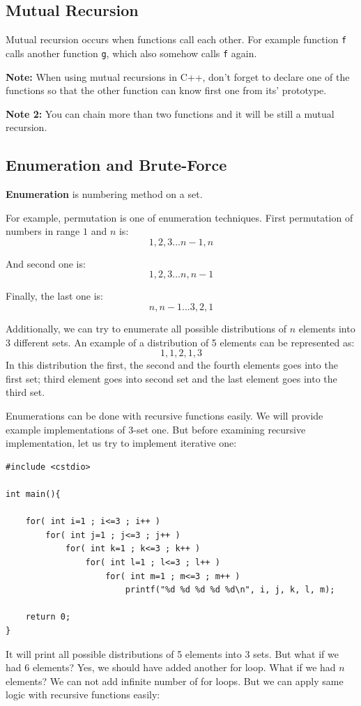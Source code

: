 \documentclass[12pt]{article}
\begin{document}
\subsection{Mutual Recursion}

Mutual recursion occurs when functions call each other. For example function \lstinline{f} calls another function \lstinline{g}, which also somehow calls \lstinline{f} again.

\textbf{Note:} When using mutual recursions in C++, don't forget to declare one of the functions so that the other function can know first one from its' prototype.

\textbf{Note 2:} You can chain more than two functions and it will be still a mutual recursion.

\subsection{Enumeration and Brute-Force}

\textbf{Enumeration} is numbering method on a set.

For example, permutation is one of enumeration techniques. First permutation of numbers in range $1$ and $n$ is:
$$1, 2, 3... n-1, n$$

And second one is:
$$1, 2, 3... n, n-1$$

Finally, the last one is:
$$n, n-1... 3, 2, 1$$

Additionally, we can try to enumerate all possible distributions of $n$ elements into 3 different sets. An example of a distribution of 5 elements can be represented as:
$$1, 1, 2, 1, 3$$
In this distribution the first, the second and the fourth elements goes into the first set; third element goes into second set and the last element goes into the third set.

\cleardoublepage
Enumerations can be done with recursive functions easily. We will provide example implementations of 3-set one. But before examining recursive implementation, let us try to implement iterative one:

\begin{verbatim}
#include <cstdio>

int main(){

    for( int i=1 ; i<=3 ; i++ )
        for( int j=1 ; j<=3 ; j++ )
            for( int k=1 ; k<=3 ; k++ )
                for( int l=1 ; l<=3 ; l++ )
                    for( int m=1 ; m<=3 ; m++ )
                        printf("%d %d %d %d %d\n", i, j, k, l, m);

    return 0;
}
\end{verbatim}
It will print all possible distributions of 5 elements into 3 sets. But what if we had 6 elements? Yes, we should have added another for loop. What if we had $n$ elements? We can not add infinite number of for loops. But we can apply same logic with recursive functions easily:
\end{document}

